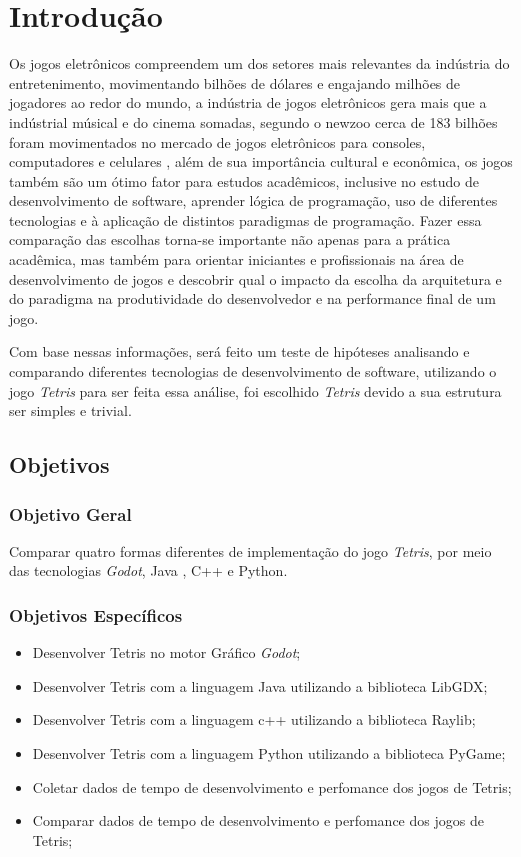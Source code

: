\chapter{Introdução}
\label{cap:01}

Os jogos eletrônicos compreendem um dos setores mais relevantes da indústria do entretenimento,
movimentando bilhões de dólares e engajando milhões de jogadores ao redor do mundo, 
a indústria de jogos eletrônicos gera mais que a indústrial músical e do cinema somadas,
segundo o newzoo cerca de 183 bilhões foram movimentados no mercado de jogos eletrônicos
para consoles, computadores e celulares \cite{Newzoo, Statista2025GamesMarket}, além de sua importância cultural
e econômica, os jogos também são um ótimo fator para estudos acadêmicos, inclusive no
estudo de desenvolvimento de software, aprender lógica de programação, uso de diferentes tecnologias e à 
aplicação de distintos paradigmas de programação.
Fazer essa comparação das escolhas torna-se importante não apenas para a prática
acadêmica, mas também para orientar iniciantes e profissionais na área de desenvolvimento de jogos e 
descobrir qual o impacto da escolha da arquitetura e do paradigma na produtividade do desenvolvedor e na 
performance final de um jogo.

Com base nessas informações, será feito um teste de hipóteses analisando e comparando diferentes tecnologias de desenvolvimento de software,
utilizando o jogo \textit{Tetris} para ser feita essa análise, foi escolhido \textit{Tetris} devido a sua estrutura ser simples e trivial.


\section{Objetivos}

\subsection{Objetivo Geral}

Comparar quatro formas diferentes de implementação do jogo \textit{Tetris}, por meio das tecnologias \textit{Godot}, Java , C++ e Python.

\subsection{Objetivos Específicos}
\begin{itemize}
	\item Desenvolver Tetris no motor Gráfico \textit{Godot};
	\item Desenvolver Tetris com a linguagem Java utilizando a biblioteca LibGDX;
	\item Desenvolver Tetris com a linguagem c++ utilizando a biblioteca Raylib;
	\item Desenvolver Tetris com a linguagem Python utilizando a biblioteca PyGame;
	\item Coletar dados de tempo de desenvolvimento e perfomance dos jogos de Tetris;
	\item Comparar dados de tempo de desenvolvimento e perfomance dos jogos de Tetris;
\end{itemize}